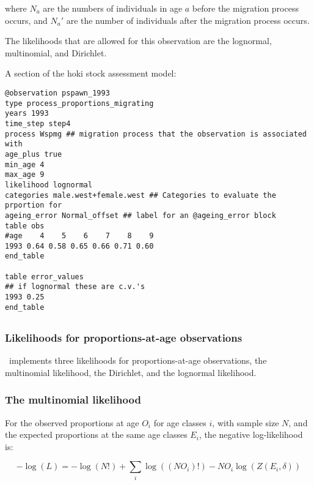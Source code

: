 \begin{itemize}
where $N_a$ are the numbers of individuals in age $a$ before the migration process occurs, and $N_a'$ are the number of individuals after the migration process occurs.

The likelihoods that are allowed for this observation are the lognormal, multinomial, and Dirichlet.

A section of the hoki stock assessment model:

{\small{\begin{verbatim}
@observation pspawn_1993
type process_proportions_migrating
years 1993
time_step step4
process Wspmg ## migration process that the observation is associated with
age_plus true
min_age 4
max_age 9
likelihood lognormal
categories male.west+female.west ## Categories to evaluate the prportion for
ageing_error Normal_offset ## label for an @ageing_error block
table obs
#age    4    5    6    7    8    9
1993 0.64 0.58 0.65 0.66 0.71 0.60
end_table

table error_values
## if lognormal these are c.v.'s
1993 0.25
end_table
\end{verbatim}}}

\end{itemize}


\subsection{}\label{sec:Likelihood}

\subsubsection{Likelihoods for proportions-at-age observations}

\CNAME\ implements three likelihoods for proportions-at-age observations, the multinomial likelihood, the Dirichlet, and the lognormal likelihood.

\subsubsection*{The multinomial likelihood}

For the observed proportions at age $O_i$ for age classes $i$, with sample size $N$, and the expected proportions at the same age classes $E_i$, the negative log-likelihood is:

\begin{equation}
-\log \left(L \right) =  -\log \left(N! \right) + \sum\limits_i \log \left( \left(NO_i \right)! \right) - NO_i \log \left(Z \left(E_i,\delta \right) \right)
\end{equation}

